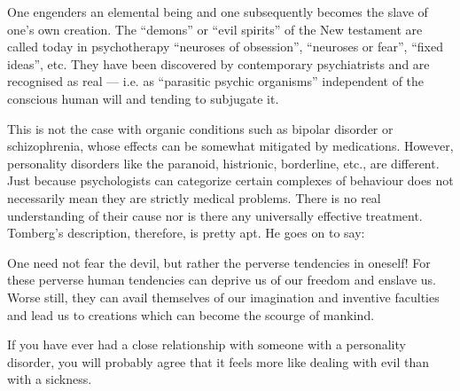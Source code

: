 \begin{quotex}
One engenders an elemental being and one subsequently becomes the slave of one's own creation. The “demons”
or “evil spirits” of the New testament are called today in psychotherapy “neuroses of obsession”, “neuroses or fear”,
“fixed ideas”, etc. They have been discovered by contemporary psychiatrists and are recognised as real — i.e. as “parasitic psychic organisms” independent of the conscious human will and tending to subjugate it.

\end{quotex}
This is not the case with organic conditions such as bipolar disorder or schizophrenia, whose effects can be somewhat
mitigated by medications. However, personality disorders like the paranoid, histrionic, borderline, etc., are
different. Just because psychologists can categorize certain complexes of behaviour does not necessarily mean they are
strictly medical problems. There is no real understanding of their cause nor is there any universally effective
treatment. Tomberg's description, therefore, is pretty apt. He goes on to say:

\begin{quotex}
One need not fear the devil, but rather the perverse tendencies in oneself! For these perverse human tendencies can
deprive us of our freedom and enslave us. Worse still, they can avail themselves of our imagination and inventive
faculties and lead us to creations which can become the scourge of mankind.

\end{quotex}
If you have ever had a close relationship with someone with a personality disorder, you will probably agree that it
feels more like dealing with evil than with a sickness.

